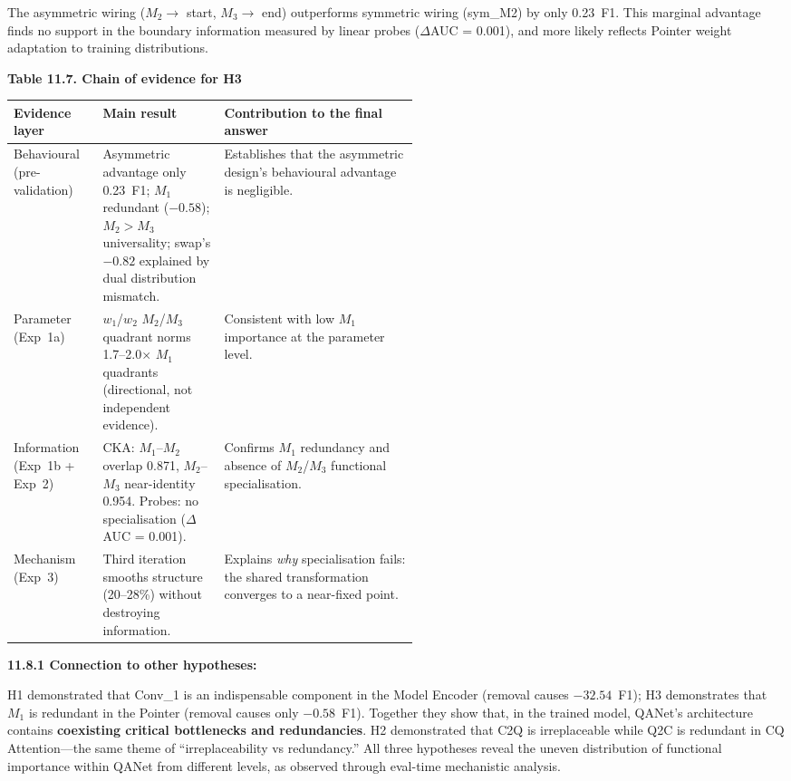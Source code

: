 \documentclass[10pt]{article}
\newcommand{\FieldLabel}[1]{%
 {\bfseries #1:}\par
}
\begin{document}
The asymmetric wiring ($M_2 \to$ start, $M_3 \to$ end) outperforms symmetric wiring (sym\_M2) by only 0.23~F1. This marginal advantage finds no support in the boundary information measured by linear probes ($\Delta$AUC = 0.001), and more likely reflects Pointer weight adaptation to training distributions.

\small
\begin{center}
{\bfseries Table 11.7. Chain of evidence for H3}\\[0.25em]
\begin{tabularx}{0.96\linewidth}{>{\raggedright\arraybackslash}p{0.22\linewidth}>{\raggedright\arraybackslash}p{0.30\linewidth}>{\raggedright\arraybackslash}X}
\toprule
\textbf{Evidence layer} & \textbf{Main result} & \textbf{Contribution to the final answer}\\
\midrule
Behavioural (pre-validation) & Asymmetric advantage only 0.23~F1; $M_1$ redundant ($-0.58$); $M_2 > M_3$ universality; swap's $-0.82$ explained by dual distribution mismatch. & Establishes that the asymmetric design's behavioural advantage is negligible.\\
Parameter (Exp~1a) & $w_1$/$w_2$ $M_2$/$M_3$ quadrant norms 1.7--2.0$\times$ $M_1$ quadrants (directional, not independent evidence). & Consistent with low $M_1$ importance at the parameter level.\\
Information (Exp~1b + Exp~2) & CKA: $M_1$--$M_2$ overlap 0.871, $M_2$--$M_3$ near-identity 0.954. Probes: no specialisation ($\Delta$AUC = 0.001). & Confirms $M_1$ redundancy and absence of $M_2$/$M_3$ functional specialisation.\\
Mechanism (Exp~3) & Third iteration smooths structure (20--28\%) without destroying information. & Explains \emph{why} specialisation fails: the shared transformation converges to a near-fixed point.\\
\bottomrule
\end{tabularx}
\end{center}
\normalsize

\FieldLabel{11.8.1 Connection to other hypotheses}

H1 demonstrated that Conv\_1 is an indispensable component in the Model Encoder (removal causes $-32.54$~F1); H3 demonstrates that $M_1$ is redundant in the Pointer (removal causes only $-0.58$~F1). Together they show that, in the trained model, QANet's architecture contains \textbf{coexisting critical bottlenecks and redundancies}. H2 demonstrated that C2Q is irreplaceable while Q2C is redundant in CQ Attention---the same theme of ``irreplaceability vs redundancy.'' All three hypotheses reveal the uneven distribution of functional importance within QANet from different levels, as observed through eval-time mechanistic analysis.
\end{document}
